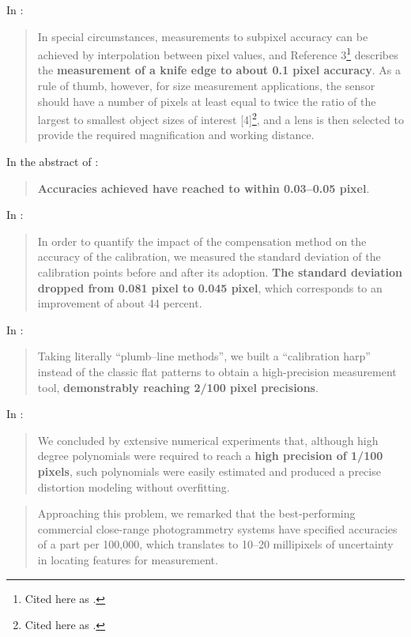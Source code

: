 \documentclass[a4paper,12pt]{article}
\begin{document}
In \cite{eren2014measurement}:
\begin{quotation}
In special circumstances, measurements to subpixel accuracy can be achieved by
interpolation between pixel values, and Reference 3\footnote{Cited here as \cite{knives}.} describes the \textbf{measurement of a knife edge to about
0.1 pixel accuracy}. As a rule of thumb, however, for size measurement applications, the sensor should
have a number of pixels at least equal to twice the ratio of the largest to smallest object sizes of interest
[4]\footnote{Cited here as \cite{hopwood1980design}.}, and a lens is then selected to provide the required magnification and working distance.
\end{quotation}

In the abstract of \cite{MIKHAIL198463}:
\begin{quotation}
\textbf{Accuracies achieved have reached to within 0.03--0.05 pixel}.
\end{quotation}

In \cite{632986}:
\begin{quotation}
In order to quantify the impact of the compensation method on
the accuracy of the calibration, we measured the standard deviation
of the calibration points before and after its adoption. \textbf{The
standard deviation dropped from 0.081 pixel to 0.045 pixel}, which
corresponds to an improvement of about 44 percent.
\end{quotation}

In \cite{Tang:12}:
\begin{quotation}
Taking literally ``plumb--line methods'', we built a ``calibration harp'' instead of the classic 
flat patterns to obtain a high-precision measurement tool, \textbf{demonstrably reaching 
2/100 pixel precisions}. 
\end{quotation}

In \cite{7885103}:
\begin{quotation}
We concluded by extensive numerical experiments that, although high degree polynomials were 
required to reach a \textbf{high precision of 1/100 pixels}, such polynomials were easily 
estimated and produced a precise distortion modeling without overfitting.
\end{quotation}

\begin{quotation}
Approaching this problem,
we remarked that the best-performing commercial close-range photogrammetry systems have 
specified accuracies of a part per 100,000, which translates to 10–20 millipixels of 
uncertainty in locating features for measurement.
\end{quotation}
\end{document}
